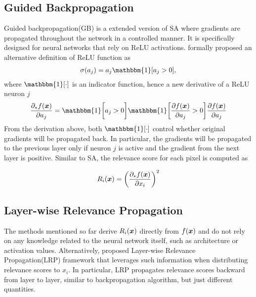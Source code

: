 \subsection{Guided Backpropagation}
Guided backpropagation(GB) is a extended version of SA where gradients are propagated throughout the network in a controlled manner. It is specifically designed for neural networks that rely on ReLU activations. \cite{SpringenbergStrivingSimplicityAll2014e} formally proposed an alternative definition  of ReLU function as
\begin{align}
	\sigma(a_j) = a_j \mathbbm{1}[ a_j > 0 ],
\end{align}
where $\mathbbm{1}[ \cdot ]$  is an indicator function, hence a new derivative of a ReLU neuron $j$ 
\begin{align}
	\frac{\partial_* f(\patvector{x}) }{ \partial a_j } = \mathbbm{1}\bigg[a_j > 0 \bigg] \mathbbm{1}\bigg[ \frac{ \partial f(\patvector{x}) }{ \partial a_j } > 0 \bigg] \frac{ \partial f(\patvector{x}) }{ \partial a_j } 
\end{align}
From the derivation above, both $\mathbbm{1}[ \cdot ]$ control whether original gradients will be propagated back. In particular, the gradients will be propagated to the previous layer only if neuron $j$ is active and the gradient from the next layer is positive. Similar to SA, the relevance score for each pixel is computed as 

\begin{align}
	R_i(\x) = \bigg( \frac{ \partial_* f(\patvector{x}) }{ \partial x_i }  \bigg)^2
\end{align}
%

\subsection{Layer-wise Relevance Propagation}
The methods mentioned so far derive $R_i(\boldsymbol{x})$ directly from $f(\patvector{x})$ and do not rely on any knowledge related to the neural network itself, such as architecture or activation values. Alternatively, \cite{BinderLayerWiseRelevancePropagation2016} proposed Layer-wise Relevance Propagation(LRP) framework that leverages such information when distributing relevance scores to $x_i$. In particular, LRP propagates relevance scores backward from layer to layer, similar to backpropagation algorithm, but just different quantities.




